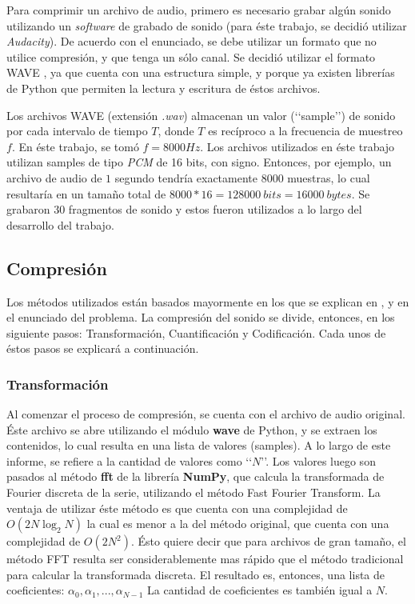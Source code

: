 \documentclass[12pt,a4paper]{article}
\begin{document}
      Para comprimir un archivo de audio, primero es necesario grabar algún sonido utilizando un \emph{software} de grabado de sonido (para éste trabajo, se decidió utilizar \emph{Audacity}).  De acuerdo con el enunciado, se debe utilizar un formato que no utilice compresión, y que tenga un sólo canal.  Se decidió utilizar el formato WAVE \cite{wave}, ya que cuenta con una estructura simple, y porque ya existen librerías de Python que permiten la lectura y escritura de éstos archivos.

      Los archivos WAVE (extensión \emph{.wav}) almacenan un valor (‘‘sample’’) de sonido por cada intervalo de tiempo $T$, donde $T$ es recíproco a la frecuencia de muestreo $f$.  En éste trabajo, se tomó $f = 8000 Hz$.  Los archivos utilizados en éste trabajo utilizan samples de tipo \emph{PCM} de 16 bits, con signo.  Entonces, por ejemplo, un archivo de audio de $1$ segundo tendría exactamente $8000$ muestras, lo cual resultaría en un tamaño total de $8000 * 16 = 128000\: bits = 16000\: bytes$. Se grabaron 30 fragmentos de sonido y estos fueron utilizados a lo largo del desarrollo del trabajo.

\subsection{Compresión}

      Los métodos utilizados están basados mayormente en los que se explican en \cite{rajesh}, y en el enunciado del problema.  La compresión del sonido se divide, entonces, en los siguiente pasos: Transformación, Cuantificación y Codificación.  Cada unos de éstos pasos se explicará a continuación.

\subsubsection{Transformación}

      Al comenzar el proceso de compresión, se cuenta con el archivo de audio original.  Éste archivo se abre utilizando el módulo \textbf{wave} de Python, y se extraen los contenidos, lo cual resulta en una lista de valores (samples).  A lo largo de este informe, se refiere a la cantidad de valores como ‘‘$N$’’. Los valores luego son pasados al método \textbf{fft} de la librería \textbf{NumPy}, que calcula la transformada de Fourier discreta de la serie, utilizando el método Fast Fourier Transform.  La ventaja de utilizar éste método es que cuenta con una complejidad de $O(2N\log_2 N)$ la cual es menor a la del método original, que cuenta con una complejidad de $O(2N^2)$.  Ésto quiere decir que para archivos de gran tamaño, el método FFT resulta ser considerablemente mas rápido que el método tradicional para calcular la transformada discreta.  El resultado es, entonces, una lista de coeficientes: $\alpha_0, \alpha_1, ..., \alpha_{N-1}$  La cantidad de coeficientes es también igual a $N$.
\end{document}

